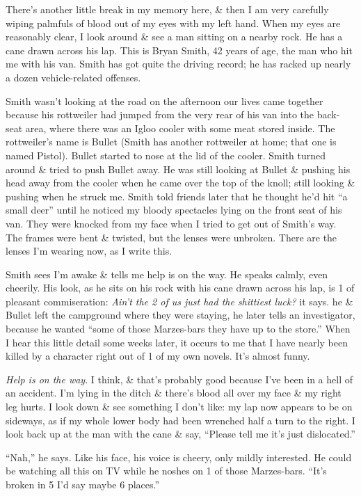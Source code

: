 \documentclass{article}
\numberwithin{equation}{section}
\begin{document}
There's another little break in my memory here, \& then I am very carefully wiping palmfuls of blood out of my eyes with my left hand. When my eyes are reasonably clear, I look around \& see a man sitting on a nearby rock. He has a cane drawn across his lap. This is Bryan Smith, 42 years of age, the man who hit me with his van. Smith has got quite the driving record; he has racked up nearly a dozen vehicle-related offenses.

Smith wasn't looking at the road on the afternoon our lives came together because his rottweiler had jumped from the very rear of his van into the back-seat area, where there was an Igloo cooler with some meat stored inside. The rottweiler's name is Bullet (Smith has another rottweiler at home; that one is named Pistol). Bullet started to nose at the lid of the cooler. Smith turned around \& tried to push Bullet away. He was still looking at Bullet \& pushing his head away from the cooler when he came over the top of the knoll; still looking \& pushing when he struck me. Smith told friends later that he thought he'd hit ``a small deer'' until he noticed my bloody spectacles lying on the front seat of his van. They were knocked from my face when I tried to get out of Smith's way. The frames were bent \& twisted, but the lenses were unbroken. There are the lenses I'm wearing now, as I write this.

 Smith sees I'm awake \& tells me help is on the way. He speaks calmly, even cheerily. His look, as he sits on his rock with his cane drawn across his lap, is 1 of pleasant commiseration: \textit{Ain't the 2 of us just had the shittiest luck?} it says. he \& Bullet left the campground where they were staying, he later tells an investigator, because he wanted ``some of those Marzes-bars they have up to the store.'' When I hear this little detail some weeks later, it occurs to me that I have nearly been killed by a character right out of 1 of my own novels. It's almost funny.

\textit{Help is on the way}. I think, \&  that's probably good because I've been in a hell of an accident. I'm lying in the ditch \& there's blood all over my face \& my right leg hurts. I look down \& see something I don't like: my lap now appears to be on sideways, as if my whole lower body had been wrenched half a turn to the right. I look back up at the man with the cane \& say, ``Please tell me it's just dislocated.''

``Nah,'' he says. Like his face, his voice is cheery, only mildly interested. He could be watching all this on TV while he noshes on 1 of those Marzes-bars. ``It's broken in 5 I'd say maybe 6 places.''
\end{document}
